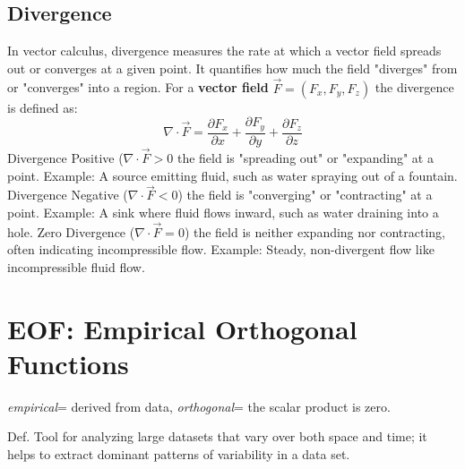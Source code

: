 \subsection{Divergence}
In vector calculus, divergence measures the rate at which a vector field spreads out or converges at a given point. It quantifies how much the field "diverges" from or "converges" into a region. For a \textbf{vector field} $\vec{F}=(F_x,F_y,F_z)$ the divergence is defined as:
$$\nabla\cdot \vec{F}=\frac{\partial F_x}{\partial x}+\frac{\partial F_y}{\partial y}+\frac{\partial F_z}{\partial z}$$
Divergence Positive ($\nabla\cdot \vec{F}>0$ the field is "spreading out" or "expanding" at a point.
Example: A source emitting fluid, such as water spraying out of a fountain.
Divergence Negative ($\nabla\cdot \vec{F}<0$) the field is "converging" or "contracting" at a point.
Example: A sink where fluid flows inward, such as water draining into a hole.
Zero Divergence ($\nabla\cdot \vec{F}=0$) the field is neither expanding nor contracting, often indicating incompressible flow.
Example: Steady, non-divergent flow like incompressible fluid flow.

\section{EOF: Empirical Orthogonal Functions}
\textit{empirical}= derived from data, \textit{orthogonal}= the scalar product is zero.


\textcolor{NavyBlue}{Def.} Tool for analyzing large datasets that vary over both space and time; it helps to extract dominant patterns of variability in a data set.
